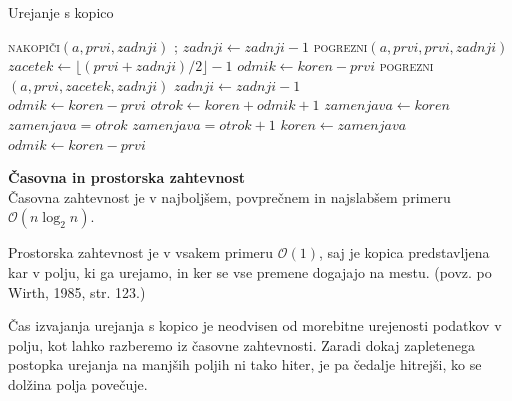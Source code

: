 \documentclass[a4paper,oneside,12pt]{article}
\newcommand{\subsubsubsection}[1]{\vspace*{1ex}\textbf{#1}\\}
\begin{document}
\begin{algorithm}[h!t!]
  \caption{Urejanje s kopico}\label{algo:heapsort}
  \begin{algorithmic}[1]
        \State \textsc{nakopiči}$(a, prvi, zadnji)$
            ;
            \State $zadnji \gets zadnji - 1$
            \State \textsc{pogrezni}$(a, prvi, prvi, zadnji)$
        \EndWhile
    \EndFunction
    \\
        \State $zacetek \gets \lfloor(prvi + zadnji) / 2\rfloor - 1$
         
            \State $odmik \gets koren - prvi$
            \State \textsc{pogrezni}$(a, prvi, zacetek, zadnji)$
            \State $zadnji \gets zadnji - 1$
        \EndWhile
    \EndFunction
    \\
        \State $odmik \gets koren - prvi$
         
            \State $otrok \gets koren + odmik + 1$
            \State $zamenjava \gets koren$ 
             
            \State $zamenjava = otrok$
            \EndIf {}
                \State $zamenjava = otrok + 1$
            \EndIf
                \State $koren \gets zamenjava$
                \State $odmik \gets koren - prvi$
            \Else
                \State \Return 
            \EndIf
        \EndWhile
    \EndFunction
  \end{algorithmic}
\end{algorithm}

\subsubsubsection{Časovna in prostorska zahtevnost}
Časovna zahtevnost je v najboljšem, povprečnem in najslabšem primeru $\mathcal{O}(n\log_2 n)$.

Prostorska zahtevnost je v vsakem primeru $\mathcal{O}(1)$, saj je kopica predstavljena kar v
polju, ki ga urejamo, in ker se vse premene dogajajo na mestu.
(povz. po Wirth, 1985, str. 123.)

Čas izvajanja urejanja s kopico je neodvisen od morebitne urejenosti podatkov v polju,
kot lahko razberemo iz časovne zahtevnosti. Zaradi dokaj zapletenega postopka urejanja
na manjših poljih ni tako hiter, je pa čedalje hitrejši, ko se dolžina polja
povečuje.
\end{document}

